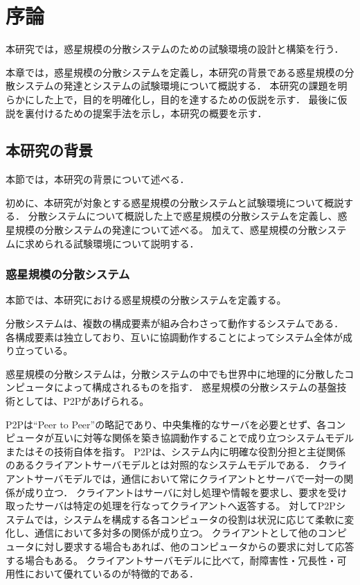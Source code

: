 \chapter{序論}
\label{introduction}

本研究では，惑星規模の分散システムのための試験環境の設計と構築を行う．

本章では，惑星規模の分散システムを定義し，本研究の背景である惑星規模の分散システムの発達とシステムの試験環境について概説する．
本研究の課題を明らかにした上で，目的を明確化し，目的を達するための仮説を示す．
最後に仮説を裏付けるための提案手法を示し，本研究の概要を示す．

\section{本研究の背景}
\label{introduction:background}

本節では，本研究の背景について述べる．

初めに、本研究が対象とする惑星規模の分散システムと試験環境について概説する．
分散システムについて概説した上で惑星規模の分散システムを定義し、惑星規模の分散システムの発達について述べる。
加えて、惑星規模の分散システムに求められる試験環境について説明する．

\subsection{惑星規模の分散システム}

本節では、本研究における惑星規模の分散システムを定義する。

分散システムは、複数の構成要素が組み合わさって動作するシステムである．
各構成要素は独立しており、互いに協調動作することによってシステム全体が成り立っている。

惑星規模の分散システムは，分散システムの中でも世界中に地理的に分散したコンピュータによって構成されるものを指す．
惑星規模の分散システムの基盤技術としては、P2Pがあげられる。

P2Pは``Peer to Peer''の略記であり、中央集権的なサーバを必要とせず、各コンピュータが互いに対等な関係を築き協調動作することで成り立つシステムモデルまたはその技術自体を指す。
P2Pは、システム内に明確な役割分担と主従関係のあるクライアントサーバモデルとは対照的なシステムモデルである．
クライアントサーバモデルでは，通信において常にクライアントとサーバで一対一の関係が成り立つ．
クライアントはサーバに対し処理や情報を要求し、要求を受け取ったサーバは特定の処理を行なってクライアントへ返答する。
対してP2Pシステムでは，システムを構成する各コンピュータの役割は状況に応じて柔軟に変化し、通信において多対多の関係が成り立つ。
クライアントとして他のコンピュータに対し要求する場合もあれば、他のコンピュータからの要求に対して応答する場合もある。
クライアントサーバモデルに比べて，耐障害性・冗長性・可用性において優れているのが特徴的である．

